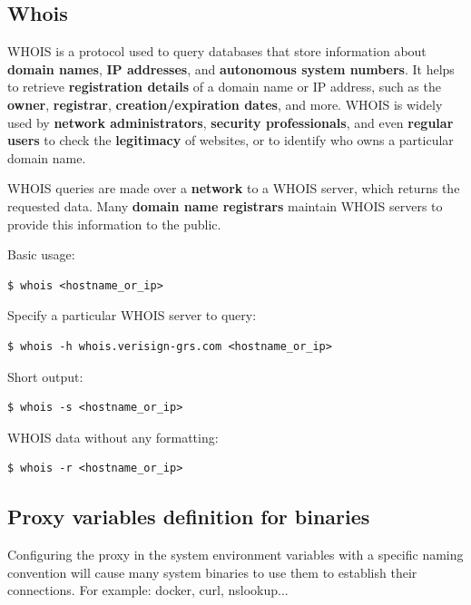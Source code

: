 \documentclass{article}
\newenvironment{codetemplate}[1][]{%
  \mybasecolorbox[#1]
  \itshape
}{%
  \endmybasecolorbox
}
\begin{document}
\subsection{Whois}
WHOIS is a protocol used to query databases that store information about \textbf{domain names}, \textbf{IP addresses}, and \textbf{autonomous system numbers}. It helps to retrieve \textbf{registration details} of a domain name or IP address, such as the \textbf{owner}, \textbf{registrar}, \textbf{creation/expiration dates}, and more. WHOIS is widely used by \textbf{network administrators}, \textbf{security professionals}, and even \textbf{regular users} to check the \textbf{legitimacy} of websites, or to identify who owns a particular domain name.

WHOIS queries are made over a \textbf{network} to a WHOIS server, which returns the requested data. Many \textbf{domain name registrars} maintain WHOIS servers to provide this information to the public.

Basic usage:
\begin{codetemplate}{}
\begin{verbatim}
$ whois <hostname_or_ip>
\end{verbatim}
\end{codetemplate}

Specify a particular WHOIS server to query:
\begin{codetemplate}{}
\begin{verbatim}
$ whois -h whois.verisign-grs.com <hostname_or_ip>
\end{verbatim}
\end{codetemplate}

Short output:
\begin{codetemplate}{}
\begin{verbatim}
$ whois -s <hostname_or_ip>
\end{verbatim}
\end{codetemplate}

WHOIS data without any formatting:
\begin{codetemplate}{}
\begin{verbatim}
$ whois -r <hostname_or_ip>
\end{verbatim}
\end{codetemplate}

\subsection{Proxy variables definition for binaries}
Configuring the proxy in the system environment variables with a specific naming convention will cause many system binaries to use them to establish their connections. For example: docker, curl, nslookup...
\end{document}
